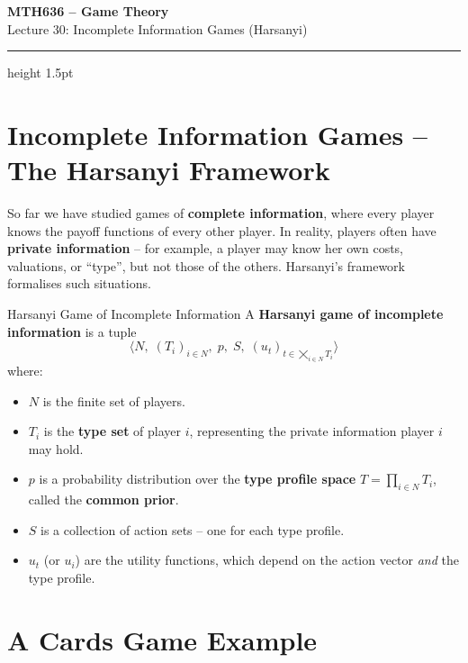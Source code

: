 \documentclass[12pt, a4paper]{article}
\begin{document}
\begin{center}
  {\LARGE\bfseries\sffamily\color{defblue} MTH636 -- Game Theory}\\[6pt]
  {\Large\sffamily Lecture 30: Incomplete Information Games (Harsanyi)}\\[4pt]
\end{center}
\vspace{0.5cm}
\hrule height 1.5pt
\vspace{0.3cm}

\section{Incomplete Information Games -- The Harsanyi Framework}

So far we have studied games of \textbf{complete information}, where every player knows the payoff functions of every other player. In reality, players often have \textbf{private information} -- for example, a player may know her own costs, valuations, or ``type'', but not those of the others. Harsanyi's framework formalises such situations.

\begin{defbox}{Harsanyi Game of Incomplete Information}
A \textbf{Harsanyi game of incomplete information} is a tuple
\[
  \langle N,\; (T_i)_{i \in N},\; p,\; S,\; (u_t)_{t \in \bigtimes_{i \in N} T_i} \rangle
\]
where:
\begin{itemize}
  \item $N$ is the finite set of players.
  \item $T_i$ is the \textbf{type set} of player $i$, representing the private information player $i$ may hold.
  \item $p$ is a probability distribution over the \textbf{type profile space} $T = \prod_{i \in N} T_i$, called the \textbf{common prior}.
  \item $S$ is a collection of action sets -- one for each type profile.
  \item $u_t$ (or $u_i$) are the utility functions, which depend on the action vector \emph{and} the type profile.
\end{itemize}
\end{defbox}

\section{A Cards Game Example}
\end{document}
